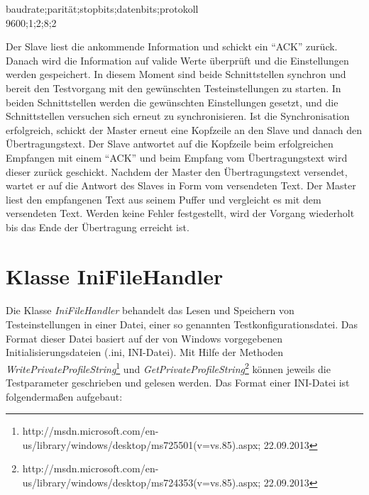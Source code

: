 \begin{center}
baudrate;parität;stopbits;datenbits;protokoll\\
9600;1;2;8;2
\end{center}

\newpage

Der Slave liest die ankommende Information und schickt ein "`ACK"' zurück. Danach wird die Information auf valide Werte überprüft und die Einstellungen werden gespeichert. In diesem Moment sind beide Schnittstellen synchron und bereit den Testvorgang mit den gewünschten Testeinstellungen zu starten. In beiden Schnittstellen werden die gewünschten Einstellungen gesetzt, und die Schnittstellen versuchen sich erneut zu synchronisieren. Ist die Synchronisation erfolgreich, schickt der Master erneut eine Kopfzeile an den Slave und danach den Übertragungstext. Der Slave antwortet auf die Kopfzeile beim erfolgreichen Empfangen mit einem "`ACK"' und beim Empfang vom Übertragungstext wird dieser zurück geschickt. Nachdem der Master den Übertragungstext versendet, wartet er auf die Antwort des Slaves in Form vom versendeten Text. Der Master liest den empfangenen Text aus seinem Puffer und vergleicht es mit dem versendeten Text. Werden keine Fehler festgestellt, wird der Vorgang wiederholt bis das Ende der Übertragung erreicht ist.


\newpage


\section{Klasse IniFileHandler}\label{IniFileHandler}
\paragraph{}
Die Klasse \textit{IniFileHandler} behandelt das Lesen und Speichern von Testeinstellungen in einer Datei, einer so genannten Testkonfigurationsdatei. Das Format dieser Datei basiert auf der von Windows vorgegebenen Initialisierungsdateien (.ini, INI-Datei). Mit Hilfe der Methoden \textit{WritePrivateProfileString}\footnote{http://msdn.microsoft.com/en-us/library/windows/desktop/ms725501(v=vs.85).aspx; 22.09.2013} und \textit{GetPrivateProfileString}\footnote{http://msdn.microsoft.com/en-us/library/windows/desktop/ms724353(v=vs.85).aspx; 22.09.2013} können jeweils die Testparameter geschrieben und gelesen werden. Das Format einer INI-Datei ist folgendermaßen aufgebaut:\\

